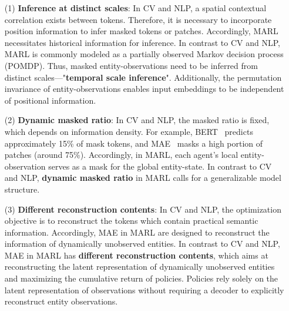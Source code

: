 \begin{enumerate}
  \item[(1)] \textbf{Inference at distinct scales}: In CV and NLP, a spatial contextual correlation exists between tokens. Therefore, it is necessary to incorporate position information to infer masked tokens or patches. Accordingly, MARL necessitates historical information for inference. In contrast to CV and NLP, MARL is commonly modeled as a partially observed Markov decision process (POMDP). Thus, masked entity-observations need to be inferred from distinct scales—"\textbf{temporal scale inference}". Additionally, the permutation invariance of entity-observations enables input embeddings to be independent of positional information.
  \item[(2)] \textbf{Dynamic masked ratio}: In CV and NLP, the masked ratio is fixed, which depends on information density. For example, BERT~\cite{devlin2018bert} predicts approximately 15\% of mask tokens, and MAE~\cite{he2022masked} masks a high portion of patches (around 75\%). Accordingly, in MARL, each agent's local entity-observation serves as a mask for the global entity-state. In contrast to CV and NLP, \textbf{dynamic masked ratio} in MARL calls for a generalizable model structure.
  \item[(3)] \textbf{Different reconstruction contents}: In CV and NLP, the optimization objective is to reconstruct the tokens which contain practical semantic information. Accordingly, MAE in MARL are designed to reconstruct the information of dynamically unobserved entities. In contrast to CV and NLP, MAE in MARL has \textbf{different reconstruction contents}, which aims at reconstructing the latent representation of dynamically unobserved entities and maximizing the cumulative return of policies. Policies rely solely on the latent representation of observations without requiring a decoder to explicitly reconstruct entity observations.
\end{enumerate}

